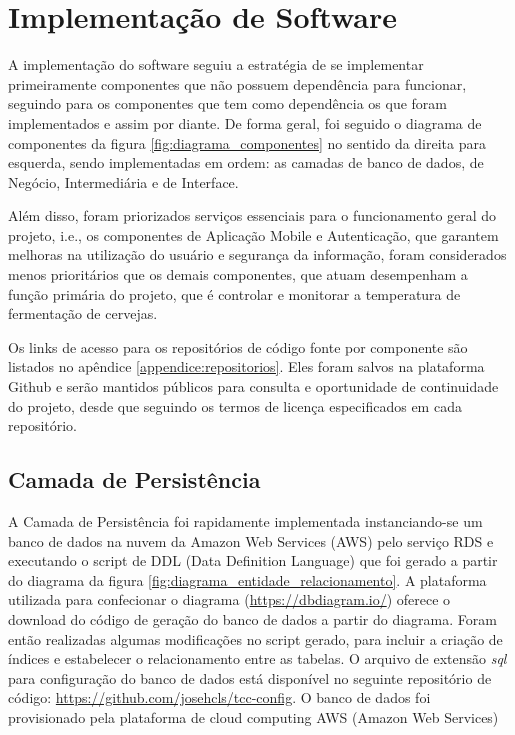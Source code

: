 \section{Implementação de Software}

A implementação do software seguiu a estratégia de se implementar primeiramente componentes que não possuem dependência para funcionar, seguindo para os componentes que tem como dependência os que foram implementados e assim por diante. De forma geral, foi seguido o diagrama de componentes da figura \ref{fig:diagrama_componentes} no sentido da direita para esquerda, sendo implementadas em ordem: as camadas de banco de dados, de Negócio, Intermediária e de Interface. 


Além disso, foram priorizados serviços essenciais para o funcionamento geral do projeto, i.e., os componentes de Aplicação Mobile e Autenticação, que garantem melhoras na utilização do usuário e segurança da informação, foram considerados menos prioritários que os demais componentes, que atuam desempenham a função primária do projeto, que é controlar e monitorar a temperatura de fermentação de cervejas.


Os links de acesso para os repositórios de código fonte por componente são listados no apêndice \ref{appendice:repositorios}. Eles foram salvos na plataforma Github e serão mantidos públicos para consulta e oportunidade de continuidade do projeto, desde que seguindo os termos de licença especificados em cada repositório.


\subsection{Camada de Persistência}


A Camada de Persistência foi rapidamente implementada instanciando-se um banco de dados na nuvem da Amazon Web Services (AWS) pelo serviço RDS e executando o script de DDL (Data Definition Language) que foi gerado a partir do diagrama da figura \ref{fig:diagrama_entidade_relacionamento}. A plataforma utilizada para confecionar o diagrama (\url{https://dbdiagram.io/}) oferece o download do código de geração do banco de dados a partir do diagrama. Foram então realizadas algumas modificações no script gerado, para incluir a criação de índices e estabelecer o relacionamento entre as tabelas. O arquivo de extensão \textit{sql} para configuração do banco de dados está disponível no seguinte repositório de código: \url{https://github.com/josehcls/tcc-config}. O banco de dados foi provisionado pela plataforma de cloud computing AWS (Amazon Web Services)  


